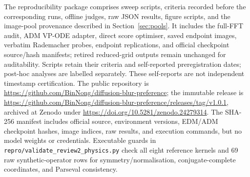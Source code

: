 \documentclass[10pt,journal]{IEEEtran}
\begin{document}
The reproducibility package comprises sweep scripts, criteria recorded before the
corresponding runs, offline judges, raw JSON results, figure scripts, and the image-pool
provenance described in Section~\ref{sec:pools}. It includes the full-FFT audit, ADM VP-ODE
adapter, direct score optimiser, saved endpoint images, verbatim Rademacher probes, endpoint
replications, and official checkpoint source/hash manifests; retired reduced-grid outputs remain
unchanged for auditability. Scripts retain their criteria and self-reported preregistration dates;
post-hoc analyses are labelled separately. These self-reports are not independent timestamp
certification. The public repository is
\url{https://github.com/BinNong/diffusion-blur-preference}; the immutable release is
\url{https://github.com/BinNong/diffusion-blur-preference/releases/tag/v1.0.1}, archived at
Zenodo under \url{https://doi.org/10.5281/zenodo.24279314}. The SHA-256 manifest includes
official source, environment versions, EDM/ADM checkpoint hashes, image indices, raw results,
and execution commands, but no model weights or credentials. Executable guards in
\texttt{repro/validate\_review2\_physics.py} check all eight reference kernels and 69 raw
synthetic-operator rows for symmetry/normalisation, conjugate-complete coordinates, and Parseval
consistency.



\end{document}
